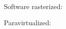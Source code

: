 \begin{landscape}
\begin{frame}
\frametitle{}
\begin{center}

Software rasterized:

\vspace{1cm}

Paravirtualized:

\end{center}
\end{frame}
\end{landscape}
